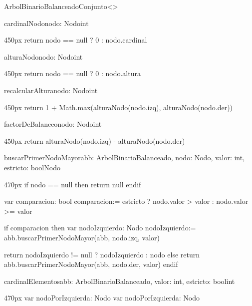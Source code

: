 \documentclass[10pt,a4paper]{article}
\begin{document}
\begin{ModuloImplements}{ArbolBinarioBalanceado}{Conjunto<\ent>}
  \begin{proc}{cardinalNodo}{\In nodo: Nodo}{int}
    \begin{ImplementationCode}{450px}
      return nodo == null ? 0 : nodo.cardinal
    \end{ImplementationCode}
  \end{proc}
  \begin{proc}{alturaNodo}{\In nodo: Nodo}{int}
    \begin{ImplementationCode}{450px}
      return nodo == null ? 0 : nodo.altura
    \end{ImplementationCode}
  \end{proc}
  \begin{proc}{recalcularAltura}{\In nodo: Nodo}{int}
    \begin{ImplementationCode}{450px}
      return 1 + Math.max(alturaNodo(nodo.izq), alturaNodo(nodo.der))
    \end{ImplementationCode}
  \end{proc}
  \begin{proc}{factorDeBalanceo}{\In nodo: Nodo}{int}
    \begin{ImplementationCode}{450px}
      return alturaNodo(nodo.izq) - alturaNodo(nodo.der)
    \end{ImplementationCode}
  \end{proc}
  \begin{proc}{buscarPrimerNodoMayor}{\In abb: ArbolBinarioBalanceado, \In nodo: Nodo, \In valor: int, \In estricto: bool}{Nodo}
    \begin{ImplementationCode}{470px}
      if nodo == null then
        return null
      endif

      var comparacion: bool
          comparacion:= estricto ? nodo.valor > valor : nodo.valor >= valor

      if comparacion then
        var nodoIzquierdo: Nodo
            nodoIzquierdo:= abb.buscarPrimerNodoMayor(abb, nodo.izq, valor)
        
        return nodoIzquierdo != null ? nodoIzquierdo : nodo
      else
        return abb.buscarPrimerNodoMayor(abb, nodo.der, valor)
      endif

    \end{ImplementationCode}
  \end{proc}
  \begin{proc}{cardinalElementos}{\In abb: ArbolBinarioBalanceado, \In valor: int, \In estricto: bool}{int}
    \begin{ImplementationCode}{470px}
      var nodoPorIzquierda: Nodo
      var nodoPorIzquierda: Nodo


\end{ImplementationCode}
\end{proc}
\end{ModuloImplements}
\end{document}
